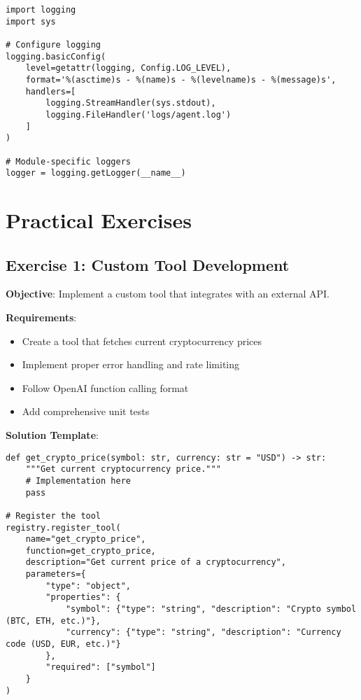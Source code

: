 \documentclass{article}
\begin{document}
\begin{lstlisting}[caption=Logging Setup]
import logging
import sys

# Configure logging
logging.basicConfig(
    level=getattr(logging, Config.LOG_LEVEL),
    format='%(asctime)s - %(name)s - %(levelname)s - %(message)s',
    handlers=[
        logging.StreamHandler(sys.stdout),
        logging.FileHandler('logs/agent.log')
    ]
)

# Module-specific loggers
logger = logging.getLogger(__name__)
\end{lstlisting}

\section{Practical Exercises}

\subsection{Exercise 1: Custom Tool Development}

\textbf{Objective}: Implement a custom tool that integrates with an external API.

\textbf{Requirements}:
\begin{itemize}
    \item Create a tool that fetches current cryptocurrency prices
    \item Implement proper error handling and rate limiting
    \item Follow OpenAI function calling format
    \item Add comprehensive unit tests
\end{itemize}

\textbf{Solution Template}:
\begin{lstlisting}[caption=Custom Tool Implementation]
def get_crypto_price(symbol: str, currency: str = "USD") -> str:
    """Get current cryptocurrency price."""
    # Implementation here
    pass

# Register the tool
registry.register_tool(
    name="get_crypto_price",
    function=get_crypto_price,
    description="Get current price of a cryptocurrency",
    parameters={
        "type": "object",
        "properties": {
            "symbol": {"type": "string", "description": "Crypto symbol (BTC, ETH, etc.)"},
            "currency": {"type": "string", "description": "Currency code (USD, EUR, etc.)"}
        },
        "required": ["symbol"]
    }
)
\end{lstlisting}
\end{document}
